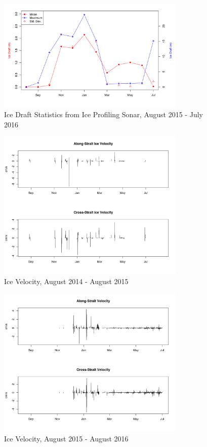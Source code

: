 \documentclass[12pt]{dforeport}
\begin{document}
\begin{figure}  
\centering
\includegraphics[width = 0.8\textwidth]{./figures/68_iceDraftStat_2015_2016.png}
\caption[Ice draft Statistics, 2015-2016]{Ice Draft Statistics from Ice Profiling Sonar, August 2015 - July 2016}
\label{f:ids_2015_2016}
\end{figure}
  


\begin{figure}  
\centering
\includegraphics[width = 0.8\textwidth]{./figures/69_iceVel_2014_2015.png}
\caption[Ice Velocity, 2014-2015]{Ice Velocity, August 2014 - August 2015}
\label{f:ivel_2014_2015}
\end{figure}

\begin{figure}  
\centering
\includegraphics[width = 0.8\textwidth]{./figures/70_iceVel_2015_2016.png}
\caption[Ice Velocity, 2015-2016]{Ice Velocity, August 2015 - August 2016}
\label{f:ivel_2015_2016}
\end{figure}
\end{document}
